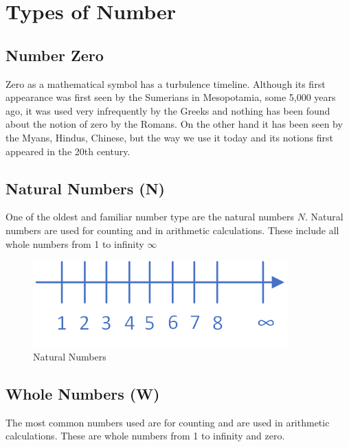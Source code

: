 \documentclass[
]{book}
\begin{document}
\hypertarget{types-of-number}{%
\section{Types of Number}\label{types-of-number}}

\hypertarget{number-zero}{%
\subsection{Number Zero}\label{number-zero}}

Zero as a mathematical symbol has a turbulence timeline. Although its first appearance was first seen by the Sumerians in Mesopotamia, some 5,000 years ago, it was used very infrequently by the Greeks and nothing has been found about the notion of zero by the Romans. On the other hand it has been seen by the Myans, Hindus, Chinese, but the way we use it today and its notions first appeared in the 20th century.

\hypertarget{natural-numbers-n}{%
\subsection{Natural Numbers (N)}\label{natural-numbers-n}}

One of the oldest and familiar number type are the natural numbers \(N\).
Natural numbers are used for counting and in arithmetic calculations. These include all whole numbers from 1 to infinity \(\infty\)

\begin{figure}

{\centering \includegraphics[width=0.4\linewidth]{images/Natural Numbers} 

}

\caption{Natural Numbers}\label{fig:unnamed-chunk-3}
\end{figure}

\hypertarget{whole-numbers-w}{%
\subsection{Whole Numbers (W)}\label{whole-numbers-w}}

The most common numbers used are for counting and are used in arithmetic calculations. These are whole numbers from 1 to infinity and zero.
\end{document}
